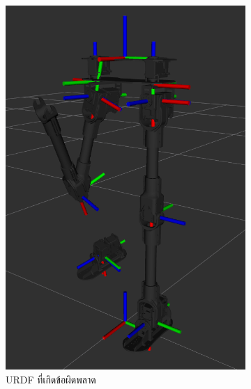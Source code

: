 \begin{figure}[!ht]
    \centering
    \begin{subfigure}[b]{0.29\textwidth}
        \centering
        \includegraphics[width=\textwidth]{chapter4/images/urdf_rviz1.png}
        \caption{URDF ที่เกิดข้อผิดพลาด}
    \end{subfigure}
    \hfill
    \begin{subfigure}[b]{0.65\textwidth}
        \centering

\end{subfigure}
\end{figure}
